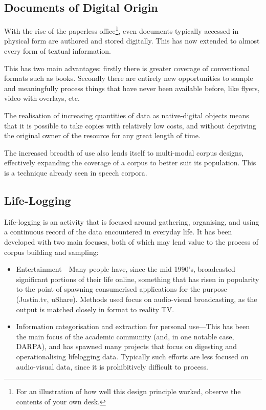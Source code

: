 





\subsection{Documents of Digital Origin}
With the rise of the paperless office\footnote{For an illustration of how well this design principle worked, observe the contents of your own desk.}, even documents typically accessed in physical form are authored and stored digitally.  This has now extended to almost every form of textual information.

This has two main advantages: firstly there is greater coverage of conventional formats such as books.  Secondly there are entirely new opportunities to sample and meaningfully process things that have never been available before, like flyers, video with overlays, etc.

The realisation of increasing quantities of data as native-digital objects means that it is possible to take copies with relatively low costs, and without depriving the original owner of the resource for any great length of time.

The increased breadth of use also lends itself to multi-modal corpus designs, effectively expanding the coverage of a corpus to better suit its population.  This is a technique already seen in speech corpora.



\subsection{Life-Logging}
Life-logging is an activity that is focused around gathering, organising, and using a continuous record of the data encountered in everyday life.  It has been developed with two main focuses, both of which may lend value to the process of corpus building and sampling:

\begin{itemize}
    \item Entertainment---Many people have, since the mid 1990's, broadcasted significant portions of their life online, something that has risen in popularity to the point of spawning consumerised applications for the purpose (Justin.tv, uShare).  Methods used focus on audio-visual broadcasting, as the output is matched closely in format to reality TV.
    \item Information categorisation and extraction for personal use---This has been the main focus of the academic community (and, in one notable case, DARPA), and has spawned many projects that focus on digesting and operationalising lifelogging data.  Typically such efforts are less focused on audio-visual data, since it is prohibitively difficult to process.
\end{itemize}


